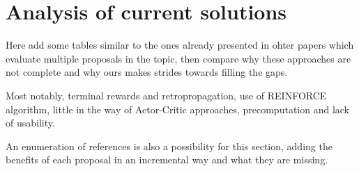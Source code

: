    


\section{Analysis of current solutions}\label{sec:moti-analysis}

Here add some tables similar to the ones already presented in ohter papers which evaluate multiple proposals in the topic, then compare why these approaches are not complete and why ours makes strides towards filling the gaps.

Most notably, terminal rewards and retropropagation, use of REINFORCE algorithm, little in the way of Actor-Critic approaches, precomputation and lack of usability.

An enumeration of references is also a possibility for this section, adding the benefits of each proposal in an incremental way and what they are missing.


